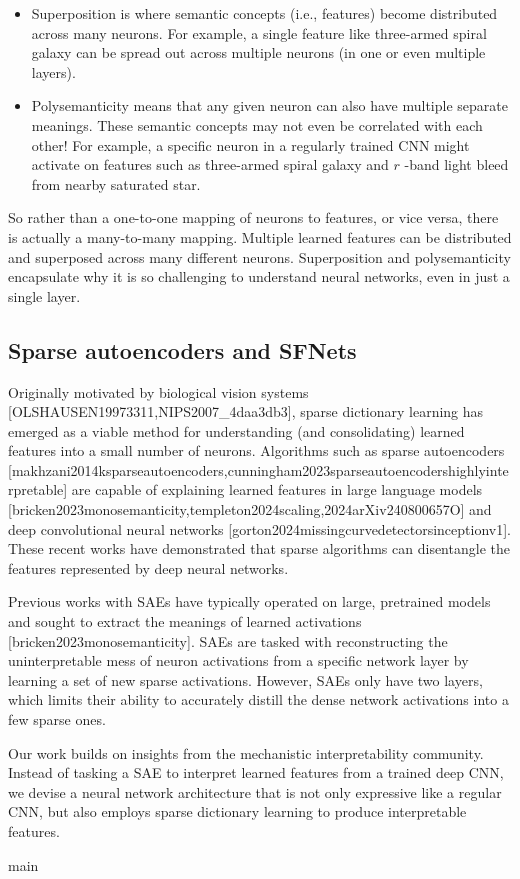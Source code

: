 \documentclass[11pt,a4paper]{article}
\begin{document}
\begin{itemize}
\item Superposition is where semantic concepts (i.e., features) become distributed across many neurons. For example, a single feature like three-armed spiral galaxy can be spread out across multiple neurons (in one or even multiple layers).
\item Polysemanticity means that any given neuron can also have multiple separate meanings. These semantic concepts may not even be correlated with each other! For example, a specific neuron in a regularly trained CNN might activate on features such as three-armed spiral galaxy and  $r$ -band light bleed from nearby saturated star.
\end{itemize}

So rather than a one-to-one mapping of neurons to features, or vice versa, there is actually a many-to-many mapping. Multiple learned features can be distributed and superposed across many different neurons. Superposition and polysemanticity encapsulate why it is so challenging to understand neural networks, even in just a single layer.

\subsection{Sparse autoencoders and SFNets}

Originally motivated by biological vision systems [OLSHAUSEN19973311,NIPS2007\_4daa3db3], sparse dictionary learning has emerged as a viable method for understanding (and consolidating) learned features into a small number of neurons. Algorithms such as sparse autoencoders [makhzani2014ksparseautoencoders,cunningham2023sparseautoencodershighlyinterpretable] are capable of explaining learned features in large language models [bricken2023monosemanticity,templeton2024scaling,2024arXiv240800657O] and deep convolutional neural networks [gorton2024missingcurvedetectorsinceptionv1]. These recent works have demonstrated that sparse algorithms can disentangle the features represented by deep neural networks.

Previous works with SAEs have typically operated on large, pretrained models and sought to extract the meanings of learned activations [bricken2023monosemanticity]. SAEs are tasked with reconstructing the uninterpretable mess of neuron activations from a specific network layer by learning a set of new sparse activations. However, SAEs only have two layers, which limits their ability to accurately distill the dense network activations into a few sparse ones.

Our work builds on insights from the mechanistic interpretability community. Instead of tasking a SAE to interpret learned features from a trained deep CNN, we devise a neural network architecture that is not only expressive like a regular CNN, but also employs sparse dictionary learning to produce interpretable features.

main
\end{document}
